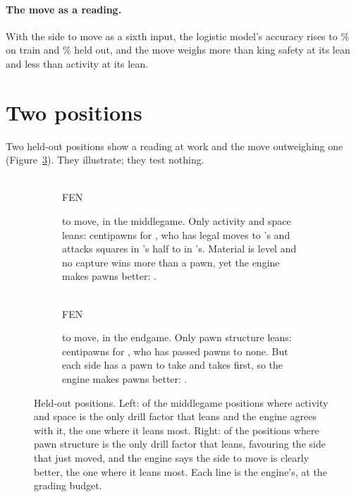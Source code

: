 \documentclass[11pt]{article}
\begin{document}
\paragraph{The move as a reading.} With the side to move as a sixth input, the logistic model's
accuracy rises to \MoveLogTrain\% on train and \MoveLogHeld\% held out, and the move weighs more
than king safety at its lean and less than activity at its lean.

\section{Two positions}

Two held-out positions show a reading at work and the move outweighing one
(Figure~\ref{fig:examples}). They illustrate; they test nothing.

\begin{figure}[ht]
\centering
\begin{subfigure}[t]{0.48\textwidth}
\centering
\EaBoard\\[0.4em]
{\footnotesize FEN \EaFen}
\caption{\EaMover{} to move, in the middlegame. Only activity and space leans: \EaValue{}
centipawns for \EaFavours, who has \EaBlackMoves{} legal moves to \EaMover's \EaWhiteMoves{} and
attacks \EaBlackSpace{} squares in \EaMover's half to \EaWhiteSpace{} in \EaFavours's. Material is
level and no capture wins more than a pawn, yet the engine makes \EaBetter{} \EaPawns{} pawns better:
\EaLine.}
\label{fig:active}
\end{subfigure}\hfill
\begin{subfigure}[t]{0.48\textwidth}
\centering
\EbBoard\\[0.4em]
{\footnotesize FEN \EbFen}
\caption{\EbMover{} to move, in the endgame. Only pawn structure leans: \EbValue{} centipawns
for \EbFavours, who has \EbPassers{} passed pawns to none. But each side has a pawn to take and
\EbMover{} takes first, so the engine makes \EbBetter{} \EbPawns{} pawns better:
\EbLine.}
\label{fig:move}
\end{subfigure}
\caption{Held-out positions. Left: of the middlegame positions where activity and space is the
only drill factor that leans and the engine agrees with it, the one where it leans most. Right:
of the positions where pawn structure is the only drill factor that leans, favouring the side
that just moved, and the engine says the side to move is clearly better, the one where it leans
most. Each line is the engine's, at the grading budget.}
\label{fig:examples}
\end{figure}
\end{document}
